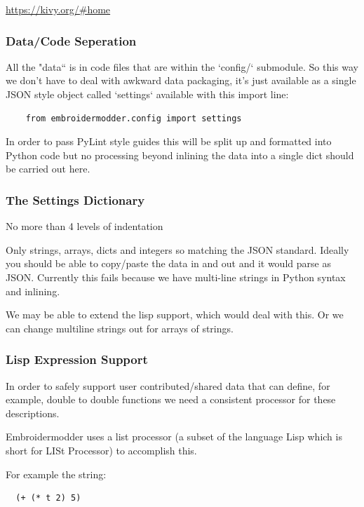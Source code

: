 \documentclass[a4paper, 11pt]{report}
\begin{document}
\url{https://kivy.org/#home}

\subsubsection{Data/Code Seperation}

All the "data`` is in code files that are within the `config/`
submodule. So this way we don't have to deal with awkward data
packaging, it's just available as a single JSON style object
called `settings` available with this import line:

\begin{verbatim}
    from embroidermodder.config import settings
\end{verbatim}

In order to pass PyLint style guides this will be split up and
formatted into Python code but no processing beyond inlining
the data into a single dict should be carried out here.

\subsubsection{The Settings Dictionary}

No more than 4 levels of indentation

Only strings, arrays, dicts and integers so matching the JSON standard. Ideally you should be able to copy/paste the data in and out and it would parse as JSON. Currently this fails because we have multi-line strings in Python syntax and inlining.

We may be able to extend the lisp support, which would deal with this. Or we can change multiline strings out for arrays of strings.

\subsubsection{Lisp Expression Support}

In order to safely support user contributed/shared data that can
define, for example, double to double functions we need a consistent
processor for these descriptions.

Embroidermodder uses a list processor (a subset of the language
Lisp which is short for LISt Processor) to accomplish this.

For example the string:

\begin{verbatim}
  (+ (* t 2) 5)
\end{verbatim}
\end{document}
